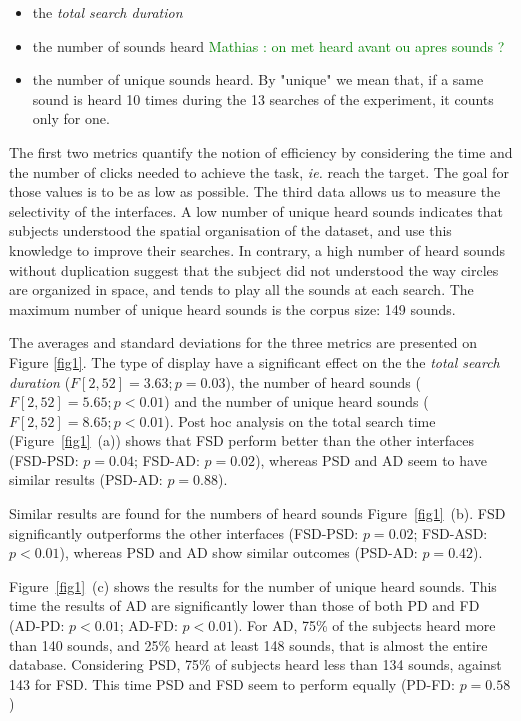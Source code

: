\documentclass{aes2e}
\newcommand{\mathias}[1]{\textcolor{green}{Mathias : #1}}
\begin{document}
\begin{itemize}
\item the \textit{total search duration}
\item the number of sounds heard \mathias{on met heard avant ou apres sounds ?} 
\item the number of unique sounds heard. By "unique" we mean that, if a same sound is heard 10 times during the 13 searches of the  experiment, it counts only for one. 
\end{itemize}

The first two metrics quantify the notion of efficiency by considering the time and the number of clicks needed to achieve the task, \textit{ie.} reach the target. The goal for those values is to be as low as possible. The third data allows us to measure the selectivity of the interfaces. A low number of unique heard sounds indicates that subjects understood the spatial organisation of the dataset, and use this knowledge to improve their searches. In contrary, a high number of heard sounds without duplication suggest that the subject did not understood the way circles are organized in space, and tends to play all the sounds at each search. The maximum number of unique heard sounds is the corpus size: 149 sounds.

The averages and standard deviations for the three metrics are presented on Figure \ref{fig1}. The type of display have a significant effect on the the \textit{total search duration} ($F[2,52]=3.63; p=0.03$), the number of heard sounds ($F[2,52]=5.65; p<0.01$) and the number of unique heard sounds ($F[2,52]=8.65; p<0.01$). Post hoc analysis on the total search time (Figure~\ref{fig1}~(a)) shows that FSD  perform better  than the other interfaces (FSD-PSD: $p=0.04$; FSD-AD: $p=0.02$), whereas PSD and AD seem to have similar results (PSD-AD: $p=0.88$).

Similar results are found for the numbers of heard sounds Figure~\ref{fig1}~(b). FSD significantly outperforms the other interfaces (FSD-PSD: $p=0.02$; FSD-ASD: $p<0.01$), whereas PSD and AD show similar outcomes (PSD-AD: $p=0.42$).

Figure~\ref{fig1}~(c) shows the results for the number of unique heard sounds. This time the results of AD are significantly lower than those of both PD and FD (AD-PD: $p<0.01$; AD-FD: $p<0.01$).  For AD, 75\% of the subjects heard more than 140 sounds, and 25\% heard at least 148 sounds, that is almost the entire database. Considering PSD, 75\% of subjects heard  less than 134 sounds, against 143 for FSD. This time PSD and FSD seem to perform equally (PD-FD: $p=0.58$)
\end{document}
